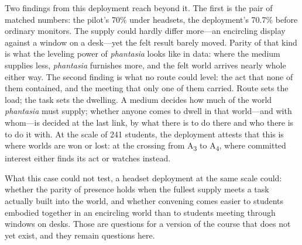 Two findings from this deployment reach beyond it. The first is the
pair of matched numbers: the pilot's 70\% under headsets, the
deployment's 70.7\% before ordinary monitors. The supply could hardly
differ more---an encircling display against a window on a desk---yet
the felt result barely moved. Parity of that kind is what the leveling
power of \textit{phantasia} looks like in data: where the medium
supplies less, \textit{phantasia} furnishes more, and the felt world
arrives nearly whole either way. The second finding is what no route
could level: the act that none of them contained, and the meeting that
only one of them carried. Route sets the load; the task sets the
dwelling. A medium decides how much of the world \textit{phantasia}
must supply; whether anyone comes to dwell in that world---and with
whom---is decided at the last link, by what there is to do there and
who there is to do it with. At the scale of 241 students, the
deployment attests that this is where worlds are won or lost: at the
crossing from A\textsubscript{3} to A\textsubscript{4}, where
committed interest either finds its act or watches instead.

What this case could not test, a headset deployment at the same scale
could: whether the parity of presence holds when the fullest supply
meets a task actually built into the world, and whether convening
comes easier to students embodied together in an encircling world than
to students meeting through windows on desks. Those are questions for
a version of the course that does not yet exist, and they remain
questions here.
